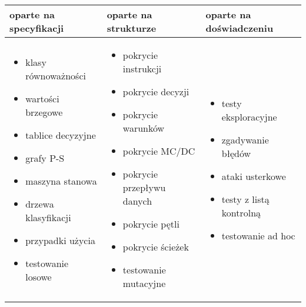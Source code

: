 \documentclass[../main.tex]{subfiles}
\begin{document}
    \begin{table}[H]
        \begin{center}
            \begin{tabular}{ p{5cm} p{5cm} p{5cm} }
                \toprule
                \textbf{oparte na specyfikacji} & \textbf{oparte na strukturze} & \textbf{oparte na doświadczeniu}\\
                \toprule
                \begin{itemize}
                    \item klasy równoważności
                    \item wartości brzegowe
                    \item tablice decyzyjne
                    \item grafy P-S
                    \item maszyna stanowa
                    \item drzewa klasyfikacji
                    \item przypadki użycia
                    \item testowanie losowe
                \end{itemize}
                &
                \begin{itemize}
                    \item pokrycie instrukcji
                    \item pokrycie decyzji
                    \item pokrycie warunków
                    \item pokrycie MC/DC
                    \item pokrycie przepływu danych
                    \item pokrycie pętli
                    \item pokrycie ścieżek
                    \item testowanie mutacyjne
                \end{itemize}
                &
                \begin{itemize}
                    \item testy eksploracyjne
                    \item zgadywanie błędów
                    \item ataki usterkowe
                    \item testy z listą kontrolną
                    \item testowanie ad hoc
                \end{itemize}\\
            \end{tabular}
        \end{center}
    \end{table}
\end{document}
